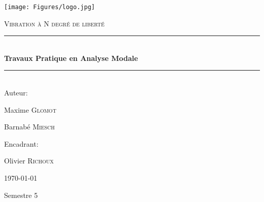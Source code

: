 \documentclass[10pt,a4paper, french]{article}
\newcommand{\HRule}{\rule{\linewidth}{0.5mm}}
\begin{document}
\begin{titlepage}
	\centering
	\texttt{[image: Figures/logo.jpg]}\par\vspace{1cm}

	\vspace{2cm}
	{\scshape\LARGE Vibration à N degré de liberté \par}
    \vspace{.5cm}
	\HRule \\[0.7cm]
	{\huge \bfseries Travaux Pratique en Analyse Modale}\\[0.4cm]
	\HRule \\[1.5cm]
	\vspace{1.3cm}
	Auteur:\par
	{\large Maxime \textsc{Glomot}  \par
  \par Barnabé \textsc{Miesch}}
	\vspace{.4cm}

	Encadrant:\par
	{\large Olivier \textsc{Richoux}} \\
	\vfill

	{\large \today \par}
    Semestre 5 \\
\end{titlepage}

\newpage
\begin{center}
\renewcommand{\contentsname}{Sommaire}
\tableofcontents
\end{center}
\renewcommand*\listfigurename{Liste des Figures}
\listoffigures
\end{document}
